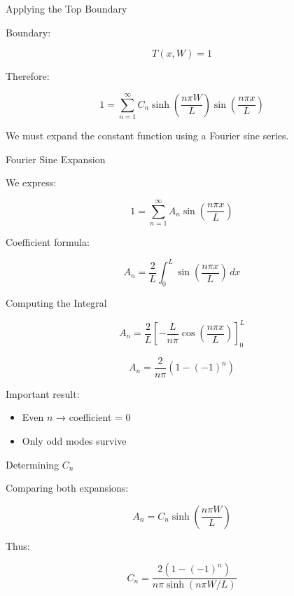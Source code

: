 \documentclass{beamer}
\begin{document}
\begin{frame}{Applying the Top Boundary}

Boundary:

\[
T(x,W)=1
\]

Therefore:

\[
1=
\sum_{n=1}^{\infty}
C_n
\sinh\left(\frac{n\pi W}{L}\right)
\sin\left(\frac{n\pi x}{L}\right)
\]

We must expand the constant function using a Fourier sine series.

\end{frame}

\begin{frame}{Fourier Sine Expansion}

We express:

\[
1=\sum_{n=1}^{\infty} A_n
\sin\left(\frac{n\pi x}{L}\right)
\]

Coefficient formula:

\[
A_n=
\frac{2}{L}
\int_0^L
\sin\left(\frac{n\pi x}{L}\right)\,dx
\]

\end{frame}

\begin{frame}{Computing the Integral}

\[
A_n=
\frac{2}{L}
\left[
-\frac{L}{n\pi}
\cos\left(\frac{n\pi x}{L}\right)
\right]_0^L
\]

\[
A_n=
\frac{2}{n\pi}
\left(1-(-1)^n\right)
\]

Important result:

\begin{itemize}
\item Even $n$ → coefficient = 0
\item Only odd modes survive
\end{itemize}

\end{frame}

\begin{frame}{Determining $C_n$}

Comparing both expansions:

\[
A_n=
C_n\sinh\left(\frac{n\pi W}{L}\right)
\]

Thus:

\[
C_n=
\frac{2(1-(-1)^n)}
{n\pi\sinh(n\pi W/L)}
\]

\end{frame}
\end{document}
